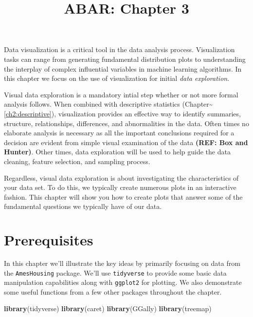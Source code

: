 \documentclass[]{article}
\title{ABAR: Chapter 3}
\author{}
\date{}
\newenvironment{Shaded}{\begin{snugshade}}{\end{snugshade}}
\newcommand{\KeywordTok}[1]{\textcolor[rgb]{0.13,0.29,0.53}{\textbf{#1}}}
\newcommand{\NormalTok}[1]{#1}
\begin{document}
\maketitle

Data visualization is a critical tool in the data analysis process.
Visualization tasks can range from generating fundamental distribution
plots to understanding the interplay of complex influential variables in
machine learning algorithms. In this chapter we focus on the use of
visualization for initial \emph{data exploration}.

Visual data exploration is a mandatory intial step whether or not more
formal analysis follows. When combined with descriptive statistics
(Chapter\textasciitilde{}\ref{ch2:descriptive}), visualization provides
an effective way to identify summaries, structure, relationships,
differences, and abnormalities in the data. Often times no elaborate
analysis is necessary as all the important conclusions required for a
decision are evident from simple visual examination of the data
\textbf{(REF: Box and Hunter)}. Other times, data exploration will be
used to help guide the data cleaning, feature selection, and sampling
process.

Regardless, visual data exploration is about investigating the
characteristics of your data set. To do this, we typically create
numerous plots in an interactive fashion. This chapter will show you how
to create plots that answer some of the fundamental questions we
typically have of our data.

\section{Prerequisites}\label{prerequisites}

In this chapter we'll illustrate the key ideas by primarily focusing on
data from the \texttt{AmesHousing} package. We'll use \texttt{tidyverse}
to provide some basic data manipulation capabilities along with
\texttt{ggplot2} for plotting. We also demonstrate some useful functions
from a few other packages throughout the chapter.

\begin{Shaded}
\begin{Highlighting}[]
\KeywordTok{library}\NormalTok{(tidyverse)}
\KeywordTok{library}\NormalTok{(caret)}
\KeywordTok{library}\NormalTok{(GGally)}
\KeywordTok{library}\NormalTok{(treemap)}
\end{Highlighting}
\end{Shaded}
\end{document}

